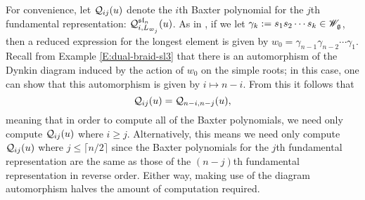 For convenience, let $\mathcal{Q}_{ij}(u)$ denote the $i$th Baxter polynomial for the $j$th fundamental representation: $\mathcal{Q}_{i,L_{\varpi_j}}^{\mathfrak{sl}_n}(u)$.
As in \cite[\S 6]{chari_braid_2002}, if we let $\gamma_k := s_1s_2\cdots s_k\in\mathscr{W}_{\mathfrak{g}}$, then a reduced expression for the longest element is given by $w_0 = \gamma_{n-1}\gamma_{n-2}\cdots\gamma_1$.
Recall from Example \ref{E:dual-braid-sl3} that there is an automorphism of the Dynkin diagram induced by the action of $w_0$ on the simple roots; in this case, one can show that this automorphism is given by $i\mapsto n-i$.
From this it follows that
\[\mathcal{Q}_{ij}(u) = \mathcal{Q}_{n-i,n-j}(u),\]
meaning that in order to compute all of the Baxter polynomials, we need only compute $\mathcal{Q}_{ij}(u)$ where $i\geq j$.
Alternatively, this means we need only compute $\mathcal{Q}_{ij}(u)$ where $j\leq\lceil n/2 \rceil$ since the Baxter polynomials for the $j$th fundamental representation are the same as those of the $(n-j)$th fundamental representation in reverse order.
Either way, making use of the diagram automorphism halves the amount of computation required.

